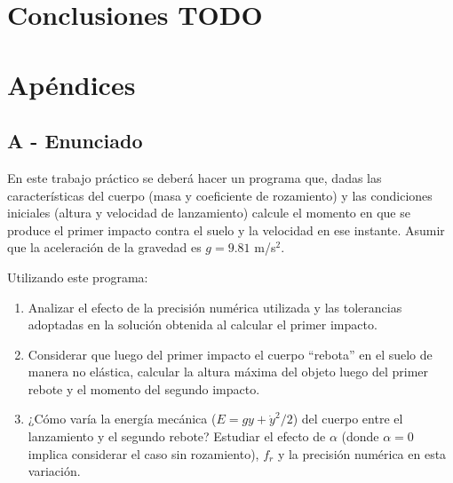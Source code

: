 \documentclass[a4paper]{article}
\begin{document}
 

\section{Conclusiones TODO}

\newpage

\section{Apéndices}
\subsection{A - Enunciado}

En este trabajo práctico se deberá hacer un programa que, dadas las características del cuerpo (masa y coeficiente de rozamiento) y las condiciones iniciales (altura y velocidad de lanzamiento) calcule el momento en que se produce el primer impacto contra el suelo y la velocidad en ese instante. Asumir que la aceleración de la gravedad es $g = 9.81$ m/s$^2$.

Utilizando este programa:
\begin{enumerate}
  \item Analizar el efecto de la precisión numérica utilizada y las tolerancias adoptadas en la solución obtenida al calcular el primer impacto.
  
  \item Considerar que luego del primer impacto el cuerpo ``rebota'' en el suelo de manera no elástica, calcular la altura máxima del objeto luego del primer rebote y el momento del segundo impacto.

  \item ¿Cómo varía la energía mecánica ($E = g y +\dot{y}^2/2$) del cuerpo entre el lanzamiento y el segundo rebote? Estudiar el efecto de $\alpha$ (donde $\alpha = 0$ implica considerar el caso sin rozamiento), $f_r$ y la precisión numérica en esta variación.
\end{enumerate}
\end{document}
